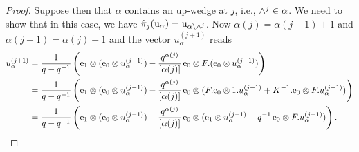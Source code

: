 \documentclass[oneside,english]{amsart}
\numberwithin{equation}{section}
\numberwithin{figure}{section}
\theoremstyle{plain}
\theoremstyle{plain}
\theoremstyle{plain}
\theoremstyle{remark}
\theoremstyle{plain}
\theoremstyle{plain}
\theoremstyle{plain}
\theoremstyle{plain}
\theoremstyle{plain}
\theoremstyle{plain}
\theoremstyle{plain}
\theoremstyle{plain}
\begin{document}
\begin{proof}
Suppose then that $\alpha$ contains an up-wedge 
at $j$, i.e., $\wedge^j \in \alpha$.
We need to show that in this case, we have 
$\hat{\pi}_j(\mathrm{u}_\alpha) 
= \mathrm{u}_{\alpha \setminus \wedge^j}$. 
Now $\alpha(j) = \alpha(j-1)+1$ and $\alpha(j+1) = \alpha(j)-1$
and the vector $u_\alpha^{(j+1)}$ reads
\begin{align*}
u_\alpha^{(j+1)} 
= \; & \frac{1}{q-q^{-1}}\left( 
\mathrm{e}_1 \otimes (\mathrm{e}_0 \otimes u_\alpha^{(j-1)})
- \frac{q^{\alpha(j)}}{\left[\alpha(j)\right]}\,
\mathrm{e}_0 \otimes F.(\mathrm{e}_0 \otimes u_\alpha^{(j-1)}) \right) \\
= \; & \frac{1}{q-q^{-1}}\left(
\mathrm{e}_1 \otimes (\mathrm{e}_0 \otimes u_\alpha^{(j-1)})
- \frac{q^{\alpha(j)}}{\left[\alpha(j)\right]}\,\mathrm{e}_0 \otimes 
(F.\mathrm{e}_0 \otimes 1.u_\alpha^{(j-1)} + K^{-1}.\mathrm{e}_0 \otimes F.u_\alpha^{(j-1)}) \right) \\
= \; & \frac{1}{q-q^{-1}}\left(
\mathrm{e}_1 \otimes (\mathrm{e}_0 \otimes u_\alpha^{(j-1)}) 
- \frac{q^{\alpha(j)}}{\left[\alpha(j)\right]}\,\mathrm{e}_0 \otimes (\mathrm{e}_1 \otimes u_\alpha^{(j-1)} + q^{-1}\, \mathrm{e}_0 \otimes F.u_\alpha^{(j-1)}) \right).
\end{align*}


\end{proof}
\end{document}

